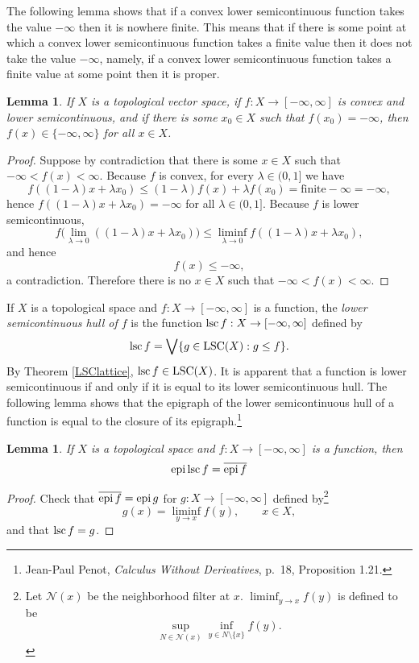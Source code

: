 \documentclass{article}
\newcommand{\epi}{\ensuremath\mathrm{epi}\,}
\newcommand{\lsc}{\ensuremath\mathrm{lsc}\,}
\newcommand{\LSC}{\ensuremath\mathrm{LSC}}
\newtheorem{lemma}[theorem]{Lemma}
\theoremstyle{definition}
\begin{document}
The following lemma shows that if a convex  lower semicontinuous function takes the value $-\infty$ then it is nowhere
finite. This means that if there is some point at which a convex  lower semicontinuous function takes a finite value then it 
does not take the value $-\infty$, namely, if a convex  lower semicontinuous function takes a finite value at some point then it
is proper.

\begin{lemma}
If $X$ is a topological vector space, if  $f:X \to [-\infty,\infty]$ is convex and lower semicontinuous, and if there is some $x_0 \in X$ such that
$f(x_0)=-\infty$, then $f(x) \in \{-\infty,\infty\}$ for all $x \in X$.
\end{lemma}
\begin{proof}
Suppose by contradiction that there is some $x \in X$ such that $-\infty<f(x)<\infty$. Because
$f$ is convex, for every $\lambda \in (0,1]$ we have
\[
f((1-\lambda)x+\lambda x_0) \leq (1-\lambda) f(x)+\lambda f(x_0) =\textrm{finite} -\infty=-\infty,
\]
hence $f((1-\lambda)x+\lambda x_0)=-\infty$ for all $\lambda \in (0,1]$.
Because $f$ is lower semicontinuous, 
\[
f\Big( \lim_{\lambda \to 0} ( (1-\lambda)x+\lambda x_0 ) \Big) \leq \liminf_{\lambda \to 0} f((1-\lambda)x+\lambda x_0),
\] 
and hence
\[
f(x) \leq -\infty,
\]
a contradiction. Therefore there is no $x \in X$ such that $-\infty<f(x)<\infty$.
\end{proof}

If $X$ is a topological space and $f:X \to [-\infty,\infty]$ is a function, the {\em lower semicontinuous hull of $f$} is the function
$\lsc f:X \to [-\infty,\infty]$ defined by
\[
\lsc f = \bigvee \{g \in \LSC(X): g \leq f\}.
\]
By Theorem \ref{LSClattice},  $\lsc f \in \LSC(X)$. It is apparent that a function is lower semicontinuous if and only
if it is equal to its lower semicontinuous hull. The following lemma shows that the epigraph of the lower semicontinuous
hull of a function is equal to the closure of its epigraph.\footnote{Jean-Paul Penot, {\em Calculus Without Derivatives},
p.~18, Proposition 1.21.}

\begin{lemma}
If $X$ is a topological space and $f:X \to [-\infty,\infty]$ is a function, then
\[
\epi \lsc f  = \overline{\epi f} 
\]
\label{epiclosure}
\end{lemma}
\begin{proof}
Check that $\overline{\epi f}=\epi g$ for $g:X \to [-\infty,\infty]$ defined by\footnote{Let $\mathscr{N}(x)$ be the neighborhood filter at $x$. $\liminf_{y \to x} f(y)$ is defined to be
\[
 \sup_{N \in \mathscr{N}(x)} \inf_{y \in N \setminus \{x\}} f(y).
\]}
\[
g(x) = \liminf_{y \to x} f(y), \qquad  x \in X,
\]
and that $\lsc f = g$.\end{proof}
\end{document}
